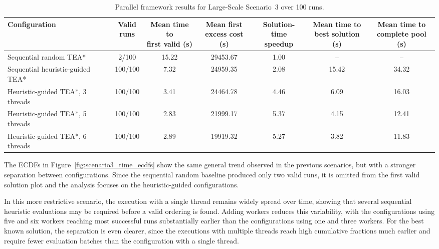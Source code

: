 \begin{table}[H]
\centering
\caption{Parallel framework results for Large-Scale Scenario~3 over 100 runs.}
\label{tab:parallel_results_scene3}
\scriptsize
\setlength{\tabcolsep}{3.5pt}
\begin{tabular}{@{}lcccccc@{}}
\toprule
\textbf{Configuration} &
\makecell{\textbf{Valid}\\\textbf{runs}} &
\makecell{\textbf{Mean time to}\\\textbf{first valid (s)}} &
\makecell{\textbf{Mean first}\\\textbf{excess cost (s)}} &
\makecell{\textbf{Solution-time}\\\textbf{speedup}} &
\makecell{\textbf{Mean time to}\\\textbf{best solution (s)}} &
\makecell{\textbf{Mean time to}\\\textbf{complete pool (s)}} \\
\midrule
Sequential random TEA*          & 2/100   & 15.22 & 29453.67 & 1.00 & --    & --    \\
Sequential heuristic-guided TEA*  & 100/100 & 7.32  & 24959.35 & 2.08 & 15.42 & 34.32 \\
Heuristic-guided TEA*, 3 threads & 100/100 & 3.41  & 24464.78 & 4.46 & 6.09  & 16.03 \\
Heuristic-guided TEA*, 5 threads & 100/100 & 2.83  & 21999.17 & 5.37 & 4.15  & 12.41 \\
Heuristic-guided TEA*, 6 threads & 100/100 & 2.89  & 19919.32 & 5.27 & 3.82  & 11.83 \\
\bottomrule
\end{tabular}
\end{table}

The ECDFs in Figure~\ref{fig:scenario3_time_ecdfs} show the same general trend observed in the
previous scenarios, but with a stronger separation between configurations. Since the sequential
random baseline produced only two valid runs, it is omitted from the first valid solution plot and
the analysis focuses on the heuristic-guided configurations.

In this more restrictive scenario, the execution with a single thread remains widely spread over time, showing that several sequential heuristic evaluations may be required before a valid ordering is found. Adding workers reduces this variability, with the configurations using five and six workers reaching most successful runs substantially earlier than the configurations using one and three workers. For the best known solution, the separation is even clearer, since the executions with multiple threads reach high cumulative fractions much earlier and require fewer evaluation batches than the configuration with a single thread.


